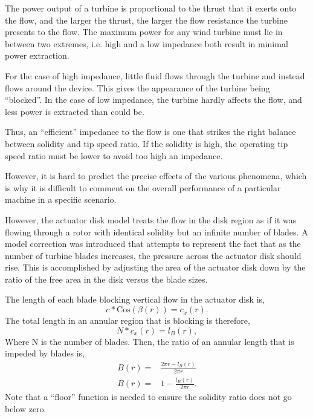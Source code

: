 The power output of a turbine is proportional to the thrust that it
exerts onto the flow, and the larger the thrust, the larger the flow
resistance the turbine presents to the flow. The maximum power for any
wind turbine must lie in between two extremes, i.e. high and
a low impedance both result in minimal power
extraction\cite{solidity_oxford}.  

For the case of high impedance, little fluid flows through the
turbine and instead flows around the device. This gives the appearance of
the turbine being ``blocked''. In the case of low impedance, the turbine
hardly affects the flow, and less power is extracted than could be. 

Thus, an ``efficient'' impedance to the flow is one that strikes the 
right balance between solidity and tip speed ratio. If the solidity is
high, the operating tip speed ratio must be lower to avoid too high an
impedance. 

However, it is hard to predict the precise effects of the various
phenomena, which is why it is difficult to comment on the overall
performance of a particular machine in a specific
scenario. %

However, the actuator disk model treats the flow in the disk region as
if it was flowing through a rotor with identical solidity but an
infinite number of blades. A model correction was introduced that
attempts to represent the fact that as the number of turbine blades
increases, the pressure across the actuator disk should rise. This is
accomplished by adjusting the area of the actuator disk down by the
ratio of the free area in the disk versus the blade sizes. 





%
%



The length of each blade blocking vertical flow in the actuator disk is, 
\begin{equation}
  c * \text{Cos}(\beta(r)) = c_x(r). 
\end{equation}
The total length in an annular region that is blocking is therefore,
\begin{equation}
  N * c_x(r) = l_B(r),
\end{equation}
Where N is the number of blades. 
Then, the ratio of an annular length that is impeded by blades is, 
\begin{eqnarray}
 B(r) =& \frac{2\pi r- l_B(r)}{2 \pi r}\\
 B(r) =& 1- \frac{l_B(r)}{2 \pi r}. 
\end{eqnarray}
Note that a ``floor'' function is needed to ensure the solidity ratio
does not go below zero. 

